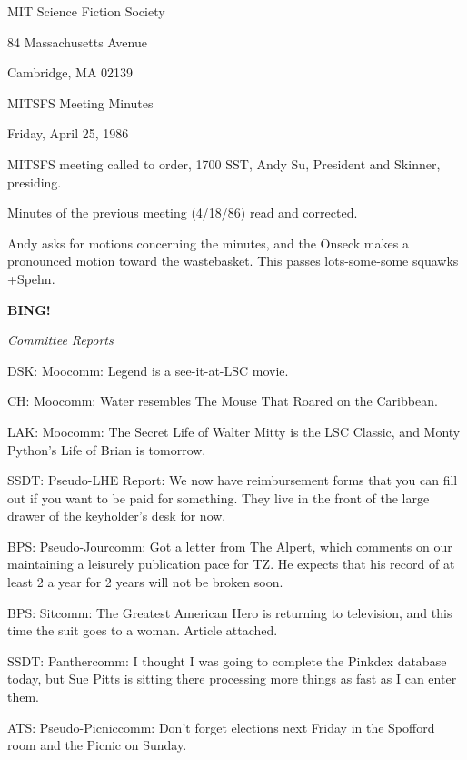 \documentclass[12pt]{article}
\newcommand{\bing}{{\bf BING!} }
\newcommand{\goto}[1]{\bing \vskip 12pt \centerline{{\em{#1}}}}
\begin{document}
\begin{center}

MIT Science Fiction Society 

84 Massachusetts Avenue

Cambridge, MA 02139

\vspace{12pt}

MITSFS Meeting Minutes 

Friday, April 25, 1986

\end{center}
 
\vspace{18pt}

\setlength{\parskip}{6pt}

\noindent
MITSFS meeting called to order, 1700 SST,
Andy Su, President and Skinner, presiding.

Minutes of the previous meeting (4/18/86) read and corrected.

Andy asks for motions concerning the minutes, and the Onseck makes a pronounced motion toward the wastebasket. This passes lots-some-some squawks +Spehn.

\goto{Committee Reports}

DSK: Moocomm: Legend is a see-it-at-LSC movie.

CH: Moocomm: Water resembles The Mouse That Roared on the Caribbean.

LAK: Moocomm: The Secret Life of Walter Mitty is the LSC Classic, and Monty Python's Life of Brian is tomorrow.

SSDT: Pseudo-LHE Report: We now have reimbursement forms that you can fill out if you want to be paid for something. They live in the front of the large drawer of the keyholder's desk for now.

BPS: Pseudo-Jourcomm: Got a letter from The Alpert, which comments on our maintaining a leisurely publication pace for TZ. He expects that his record of at least 2 a year for 2 years will not be broken soon.

BPS: Sitcomm: The Greatest American Hero is returning to television, and this time the suit goes to a woman. Article attached.

SSDT: Panthercomm: I thought I was going to complete the Pinkdex database today, but Sue Pitts is sitting there processing more things as fast as I can enter them.

ATS: Pseudo-Picniccomm: Don't forget elections next Friday in the Spofford room and the Picnic on Sunday.
\end{document}
